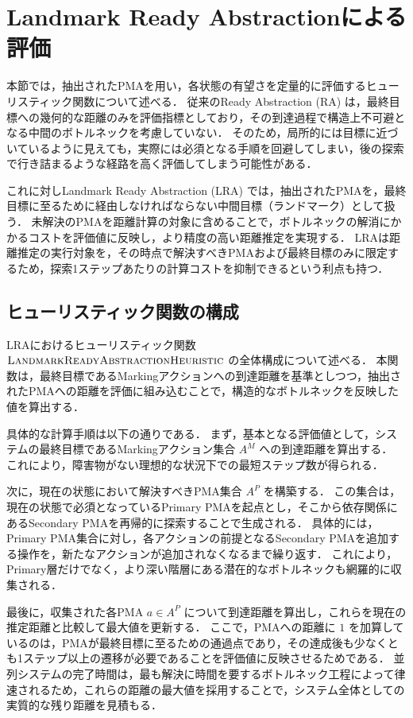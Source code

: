 \documentclass[a4paper,11pt,oneside,openany,report,dvipdfmx]{jsbook}
\begin{document}
\section{Landmark Ready Abstractionによる評価}

本節では，抽出されたPMAを用い，各状態の有望さを定量的に評価するヒューリスティック関数について述べる．
従来のReady Abstraction (RA) は，最終目標への幾何的な距離のみを評価指標としており，その到達過程で構造上不可避となる中間のボトルネックを考慮していない．
そのため，局所的には目標に近づいているように見えても，実際には必須となる手順を回避してしまい，後の探索で行き詰まるような経路を高く評価してしまう可能性がある．

これに対しLandmark Ready Abstraction (LRA) では，抽出されたPMAを，最終目標に至るために経由しなければならない中間目標（ランドマーク）として扱う．
未解決のPMAを距離計算の対象に含めることで，ボトルネックの解消にかかるコストを評価値に反映し，より精度の高い距離推定を実現する．
LRAは距離推定の実行対象を，その時点で解決すべきPMAおよび最終目標のみに限定するため，探索1ステップあたりの計算コストを抑制できるという利点も持つ．

\subsection{ヒューリスティック関数の構成}

LRAにおけるヒューリスティック関数 $\textsc{LandmarkReadyAbstractionHeuristic}$ の全体構成について述べる．
本関数は，最終目標であるMarkingアクションへの到達距離を基準としつつ，抽出されたPMAへの距離を評価に組み込むことで，構造的なボトルネックを反映した値を算出する．

具体的な計算手順は以下の通りである．
まず，基本となる評価値として，システムの最終目標であるMarkingアクション集合 $A^M$ への到達距離を算出する．
これにより，障害物がない理想的な状況下での最短ステップ数が得られる．

次に，現在の状態において解決すべきPMA集合 $A^P$ を構築する．
この集合は，現在の状態で必須となっているPrimary PMAを起点とし，そこから依存関係にあるSecondary PMAを再帰的に探索することで生成される．
具体的には，Primary PMA集合に対し，各アクションの前提となるSecondary PMAを追加する操作を，新たなアクションが追加されなくなるまで繰り返す．
これにより，Primary層だけでなく，より深い階層にある潜在的なボトルネックも網羅的に収集される．

最後に，収集された各PMA $a \in A^P$ について到達距離を算出し，これらを現在の推定距離と比較して最大値を更新する．
ここで，PMAへの距離に $1$ を加算しているのは，PMAが最終目標に至るための通過点であり，その達成後も少なくとも1ステップ以上の遷移が必要であることを評価値に反映させるためである．
並列システムの完了時間は，最も解決に時間を要するボトルネック工程によって律速されるため，これらの距離の最大値を採用することで，システム全体としての実質的な残り距離を見積もる．
\end{document}
